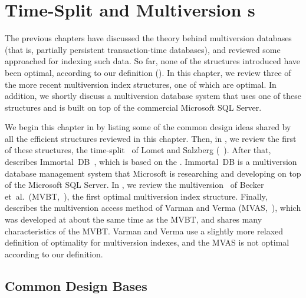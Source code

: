 \chapter{Time-Split and Multiversion \Btree{}s}
\label{chapter:tsbmvbt}

The previous chapters have discussed the theory behind multiversion
databases (that is, partially persistent transaction-time databases), and 
reviewed some approached for indexing such data.
So far, none of the structures introduced have been optimal,
according to our definition ().
In this chapter, we review three of the more recent multiversion index
structures, one of which are optimal.
In addition, we shortly discuss a multiversion database system that uses one
of these structures and is built on top of the commercial Microsoft SQL
Server.

We begin this chapter in  by listing some of
the common design ideas shared by all the efficient structures reviewed in
this chapter. 
Then, in , we review the first of these structures,
the time-split \Btree\
of Lomet and
Salzberg (\TSBtree~\cite{lomet:1989:tsb,lomet:1990:tsb-performance}). 
After that, \secref{sec:tsbmvbt:immortaldb} describes
Immortal~DB~\cite{lomet:2005:immortaldb,lomet:2006:transactiontime,lomet:2008:version-compression,lomet:2009:improving},
which is based on the \TSBtree. 
Immortal~DB is a multiversion database management system that Microsoft is
researching and developing on top of the Microsoft SQL Server.
In , we review the multiversion \Btree\ of Becker 
et~al.\ (MVBT,~\cite{becker:1993:optimal,becker:1996:mvbt}), the first optimal
multiversion index structure.
Finally,  describes the multiversion access method
of Varman and Verma (MVAS,~\cite{varman:1997:multiversion}), which was
developed at about the same time as the MVBT, and shares many characteristics
of the MVBT\@.
Varman and Verma use a slightly more relaxed definition of optimality for
multiversion indexes, and the MVAS is not optimal according to our definition.



\section{Common Design Bases}
\label{sec:tsbmvbt:common}


